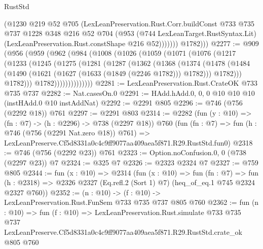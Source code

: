 \begin{lexlean}{RustStd}
\begin{coremodule}
                (@1230
                  @219
                  @52
                  @705
                  (LexLeanPreservation.Rust.Corr.buildConst
                    @733
                    @735
                    @737
                    @1228
                    @348
                    @216
                    @52
                    @704
                    (@953
                      (@744 LexLeanTarget.RustSyntax.Lit)
                      (LexLeanPreservation.Rust.constShape @216 @52)))))))
          @1782)))
@2277 := @909
    (@956
      (@959
        (@962
          (@984
            (@1008
              (@1026
                (@1059
                  (@1071
                    (@1076
                      (@1217
                        (@1233
                          (@1245
                            (@1275
                              (@1281
                                (@1287
                                  (@1362
                                    (@1368
                                      (@1374
                                        (@1478
                                          (@1484
                                            (@1490
                                              (@1621 (@1627 (@1633 (@1849 (@2246 @1782))) @1782)))
                                            @1782)))
                                      @1782)))
                                @1782))))))))))))))
@2281 := LexLeanPreservation.Rust.CrateOK @733 @735 @737
@2282 := Nat.casesOn.{0}
@2291 := HAdd.hAdd.{0, 0, 0} @10 @10 @10 (instHAdd.{0} @10 instAddNat)
@2292 := @2291 @805
@2296 := @746 (@756 (@2292 @18)) @761
@2297 := @2291 @803
@2314 := @2282
    (fun (y : @10) => (fn : @7) -> (h : @2296) -> @738 (@2297 @18))
    @760
    (fun (fn : @7) =>
    fun (h : @746 (@756 (@2291 Nat.zero @18)) @761) =>
    LexLeanPreserve.Cf5d8331a0c4c9ff9077aa409aea5f871.R29.RustStd.fun0)
@2318 := @746 (@756 (@2292 @23)) @761
@2323 := Option.noConfusion.{0, 0} (@738 (@2297 @23)) @7
@2324 := @325 @7
@2326 := @2323 @2324 @7
@2327 := @759 @805
@2344 := fun (x : @10) =>
  @2314
    (fun (x : @10) =>
    fun (fn : @7) =>
    fun (h : @2318) => @2326 @2327 (Eq.refl.{2} (Sort 1) @7) (heq_of_eq.{1} @745 @2324 @2327 @760))
@2352 := (n : @10) -> (f : @10) -> LexLeanPreservation.Rust.FunSem @733 @735 @737 @805 @760
@2362 := fun (n : @10) =>
  fun (f : @10) =>
  LexLeanPreservation.Rust.simulate
    @733
    @735
    @737
    LexLeanPreserve.Cf5d8331a0c4c9ff9077aa409aea5f871.R29.RustStd.crate_ok
    @805
    @760
\end{coremodule}
\end{lexlean}
